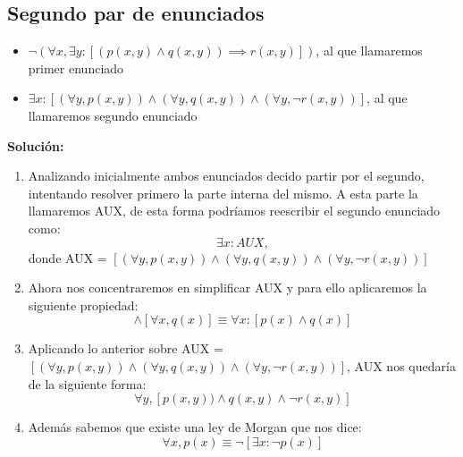 \documentclass[../main.tex]{subfiles}
\begin{document}

\subsection{Segundo par de enunciados}
\begin{itemize}
    \item $\neg ( \forall x, \exists y: [ (p(x,y) \land q(x,y)) \implies r(x,y) ] )$, al que llamaremos primer enunciado
    \item $\exists x : [(\forall y, p(x,y)) \land (\forall y, q(x,y)) \land (\forall y, \neg r(x,y))]$, al que llamaremos segundo enunciado
\end{itemize}

\bigskip
\textbf{Solución:}

\begin{enumerate}
    \item Analizando inicialmente ambos enunciados decido partir por el segundo, intentando resolver primero la parte interna del mismo. A esta parte la llamaremos AUX, de esta forma podríamos reescribir el segundo enunciado como:
    \begin{equation*}
        \exists x : AUX,
    \end{equation*}
    donde AUX = $[(\forall y, p(x,y)) \land (\forall y, q(x,y)) \land (\forall y, \neg r(x,y))]$
    
    \item Ahora nos concentraremos en simplificar AUX y para ello aplicaremos la siguiente propiedad:
    \begin{equation*}
        [\forall x, p(x)] \land [\forall x, q(x)] \equiv \forall x : [p(x) \land q(x)]
    \end{equation*}

    \item Aplicando lo anterior sobre AUX = $[(\forall y, p(x,y)) \land (\forall y, q(x,y)) \land (\forall y, \neg r(x,y))]$, AUX nos quedaría de la siguiente forma: 
    \begin{equation*}
        \forall y, [p(x,y)) \land q(x,y) \land \neg r(x,y)]
    \end{equation*}
    
    \item Además sabemos que existe una ley de Morgan que nos dice:
    \begin{equation*}
        \forall x,  p(x) \equiv \neg [\exists x : \neg p(x)]
    \end{equation*}
    

\end{enumerate}
\end{document}
